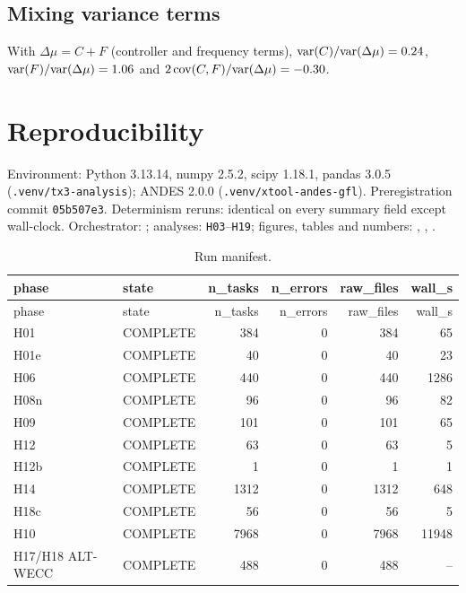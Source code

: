 \documentclass[10pt,a4paper]{article}
\begin{document}
\subsection{Mixing variance terms}
With $\Delta\mu=C+F$ (controller and frequency terms), ${\rm var}(C)/{\rm var}(\Delta\mu)=0.24$, ${\rm var}(F)/{\rm var}(\Delta\mu)=1.06$ and $2\,{\rm cov}(C,F)/{\rm var}(\Delta\mu)=-0.30$.


\section{Reproducibility}
Environment: Python 3.13.14, numpy 2.5.2, scipy 1.18.1, pandas 3.0.5 (\texttt{.venv/tx3-analysis}); ANDES 2.0.0 (\texttt{.venv/xtool-andes-gfl}). Preregistration commit \texttt{05b507e3}. Determinism reruns: identical on every summary field except wall-clock. Orchestrator: ; analyses: \texttt{H03}--\texttt{H19}; figures, tables and numbers: , , .

{\scriptsize
\begin{longtable}{llrrrr}
\caption{Run manifest.}\label{tab:s-man}\\
\toprule
phase & state & n\_tasks & n\_errors & raw\_files & wall\_s \\
\midrule
\endfirsthead
\toprule
phase & state & n\_tasks & n\_errors & raw\_files & wall\_s \\
\midrule
\endhead
H01 & COMPLETE & 384 & 0 & 384 & 65 \\
H01e & COMPLETE & 40 & 0 & 40 & 23 \\
H06 & COMPLETE & 440 & 0 & 440 & 1286 \\
H08n & COMPLETE & 96 & 0 & 96 & 82 \\
H09 & COMPLETE & 101 & 0 & 101 & 65 \\
H12 & COMPLETE & 63 & 0 & 63 & 5 \\
H12b & COMPLETE & 1 & 0 & 1 & 1 \\
H14 & COMPLETE & 1312 & 0 & 1312 & 648 \\
H18c & COMPLETE & 56 & 0 & 56 & 5 \\
H10 & COMPLETE & 7968 & 0 & 7968 & 11948 \\
H17/H18 ALT-WECC & COMPLETE & 488 & 0 & 488 & -- \\
\bottomrule
\end{longtable}}
\end{document}
